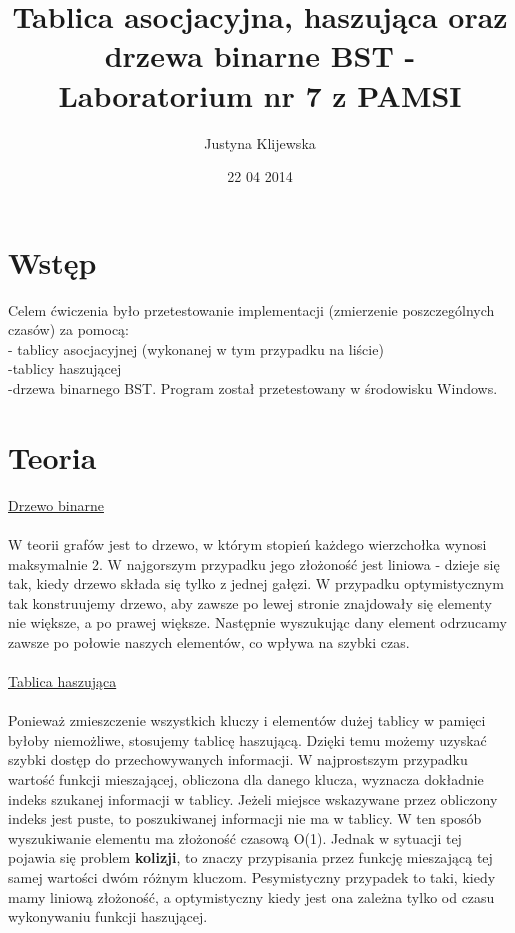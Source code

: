 \documentclass[11pt]{article}
\begin{document}
\begin{titlepage}
\title{Tablica asocjacyjna, haszująca oraz drzewa binarne BST - Laboratorium nr 7 z PAMSI}
\author{Justyna Klijewska}
\date{22 04 2014}
\maketitle
\end{titlepage}
\section{Wstęp}
Celem ćwiczenia było przetestowanie implementacji (zmierzenie poszczególnych czasów) za pomocą: \\
- tablicy asocjacyjnej (wykonanej w tym przypadku na liście) \\ -tablicy haszującej \\ -drzewa binarnego BST.
Program został przetestowany w środowisku Windows.

\section{Teoria}
\underline {Drzewo binarne} \\ \\
W teorii grafów jest to drzewo, w którym stopień każdego wierzchołka wynosi maksymalnie 2. W najgorszym przypadku jego złożoność jest liniowa - dzieje się tak, kiedy drzewo składa się tylko z jednej gałęzi. W przypadku optymistycznym tak konstruujemy drzewo, aby zawsze po lewej stronie znajdowały się elementy nie większe, a po prawej większe. Następnie wyszukując dany element odrzucamy zawsze po połowie naszych elementów, co wpływa na szybki czas.
\\ \\
\underline {Tablica haszująca} \\ \\
Ponieważ zmieszczenie wszystkich kluczy i elementów dużej tablicy w pamięci byłoby niemożliwe, stosujemy tablicę haszującą. Dzięki temu możemy uzyskać szybki dostęp do przechowywanych informacji. W najprostszym przypadku wartość funkcji mieszającej, obliczona dla danego klucza, wyznacza dokładnie indeks szukanej informacji w tablicy. Jeżeli miejsce wskazywane przez obliczony indeks jest puste, to poszukiwanej informacji nie ma w tablicy. W ten sposób wyszukiwanie elementu ma złożoność czasową O(1). Jednak w sytuacji tej pojawia się problem \textbf {kolizji}, to znaczy przypisania przez funkcję mieszającą tej samej wartości dwóm różnym kluczom. Pesymistyczny przypadek to taki, kiedy mamy liniową złożoność, a optymistyczny kiedy jest ona zależna tylko od czasu wykonywaniu funkcji haszującej. 
\\ \\ \\
\end{document}
